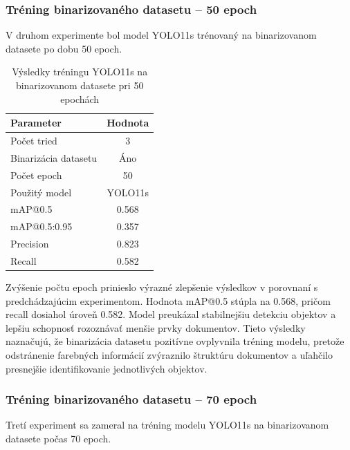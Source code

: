             \subsubsection{Tréning binarizovaného datasetu – 50 epoch}

            V druhom experimente bol model YOLO11s trénovaný na binarizovanom datasete po dobu 50 epoch.

            \begin{table}[H]
                \centering
                \begin{tabular}{|l|c|}
                \hline
                \textbf{Parameter} & \textbf{Hodnota} \\ \hline
                Počet tried & 3 \\ \hline
                Binarizácia datasetu & Áno \\ \hline
                Počet epoch & 50 \\ \hline
                Použitý model & YOLO11s \\ \hline
                mAP@0.5 & 0.568 \\ \hline
                mAP@0.5:0.95 & 0.357 \\ \hline
                Precision & 0.823 \\ \hline
                Recall & 0.582 \\ \hline
                \end{tabular}
                \caption{Výsledky tréningu YOLO11s na binarizovanom datasete pri 50 epochách}
                \label{tab:yolo11s_binary_50}
            \end{table}

            Zvýšenie počtu epoch prinieslo výrazné zlepšenie výsledkov v porovnaní s predchádzajúcim experimentom. Hodnota mAP@0.5 stúpla na 0.568, pričom recall dosiahol úroveň 0.582. Model preukázal stabilnejšiu detekciu objektov a lepšiu schopnosť rozoznávať menšie prvky dokumentov. Tieto výsledky naznačujú, že binarizácia datasetu pozitívne ovplyvnila tréning modelu, pretože odstránenie farebných informácií zvýraznilo štruktúru dokumentov a uľahčilo presnejšie identifikovanie jednotlivých objektov.

            \subsubsection{Tréning binarizovaného datasetu – 70 epoch}

            Tretí experiment sa zameral na tréning modelu YOLO11s na binarizovanom datasete počas 70 epoch.

